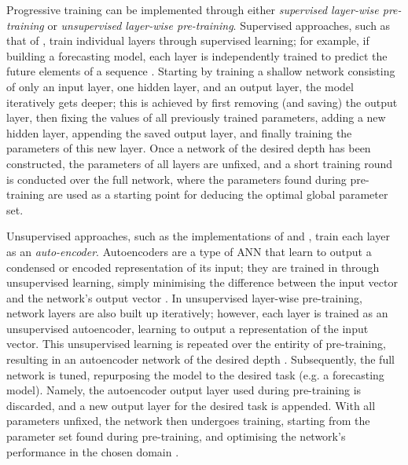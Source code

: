\documentclass[a4paper, 11pt]{report}
\begin{document}
    Progressive training can be implemented through either \emph{supervised layer-wise pre-training} or \emph{unsupervised layer-wise pre-training}. Supervised approaches, such as that of \citet{ienco-2019}, train individual layers through supervised learning; for example, if building a forecasting model, each layer is independently trained to predict the future elements of a sequence \citep{xu-2018}. Starting by training a shallow network consisting of only an input layer, one hidden layer, and an output layer, the model iteratively gets deeper; this is achieved by first removing (and saving) the output layer, then fixing the values of all previously trained parameters, adding a new hidden layer, appending the saved output layer, and finally training the parameters of this new layer. Once a network of the desired depth has been constructed, the parameters of all layers are unfixed, and a short training round is conducted over the full network, where the parameters found during pre-training are used as a starting point for deducing the optimal global parameter set. 

    Unsupervised approaches, such as the implementations of \citet{xu-2018} and \citet{sagheer-2019}, train each layer as an \emph{auto-encoder}. Autoencoders are a type of ANN that learn to output a condensed or encoded representation of its input; they are trained in through unsupervised learning, simply minimising the difference between the input vector and the network's output vector \citep{pinaya-2019}. In unsupervised layer-wise pre-training, network layers are also built up iteratively; however, each layer is trained as an unsupervised autoencoder, learning to output a representation of the input vector. This unsupervised learning is repeated over the entirity of pre-training, resulting in an autoencoder network of the desired depth \citep{sagheer-2019}. Subsequently, the full network is tuned, repurposing the model to the desired task (e.g. a forecasting model). Namely, the autoencoder output layer used during pre-training is discarded, and a new output layer for the desired task is appended. With all parameters unfixed, the network then undergoes training, starting from the parameter set found during pre-training, and optimising the network's performance in the chosen domain \citep{sagheer-2019}.
\end{document}
